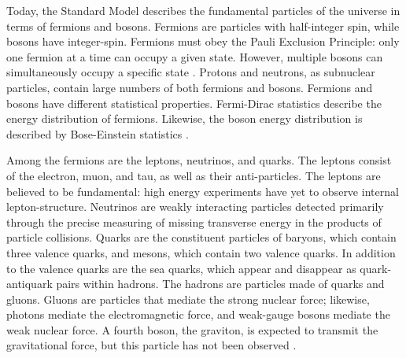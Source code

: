 Today, the Standard Model describes the fundamental particles of the universe in terms of fermions and bosons. Fermions are particles with half-integer spin, while bosons have integer-spin. Fermions must obey the Pauli Exclusion Principle: only one fermion at a time can occupy a given state. However, multiple bosons can simultaneously occupy a specific state \cite{Dyson:1967:SM}. Protons and neutrons, as subnuclear particles, contain large numbers of both fermions and bosons. Fermions and bosons have different statistical properties. Fermi-Dirac statistics describe the energy distribution of fermions. Likewise, the boson energy distribution is described by Bose-Einstein statistics \cite{Huang_1987}. 

Among the fermions are the leptons, neutrinos, and quarks. The leptons consist of the electron, muon, and tau, as well as their anti-particles. The leptons are believed to be fundamental: high energy experiments have yet to observe internal lepton-structure. Neutrinos are weakly interacting particles detected primarily through the precise measuring of missing transverse energy in the products of particle collisions. Quarks are the constituent particles of baryons, which contain three valence quarks, and mesons, which contain two valence quarks. In addition to the valence quarks are the sea quarks, which appear and disappear as quark-antiquark pairs within hadrons. The hadrons are particles made of quarks and gluons. Gluons are particles that mediate the strong nuclear force; likewise, photons mediate the electromagnetic force, and weak-gauge bosons mediate the weak nuclear force. A fourth boson, the graviton, is expected to transmit the gravitational force, but this particle has not been observed \cite{Halzen:1984mc}. 

